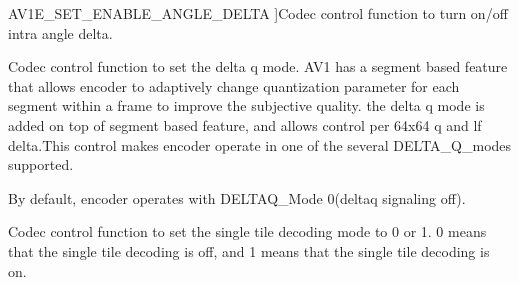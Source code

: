 \begin{Desc}
\begin{description}
{A\+V1\+E\+\_\+\+S\+E\+T\+\_\+\+E\+N\+A\+B\+L\+E\+\_\+\+A\+N\+G\+L\+E\+\_\+\+D\+E\+L\+TA\hypertarget{group__aom__encoder_ggae78dde67a6d78f332e9bdba0dde42db5a3155057080db493c868eb2d42d435b61}{}\label{group__aom__encoder_ggae78dde67a6d78f332e9bdba0dde42db5a3155057080db493c868eb2d42d435b61}
}]Codec control function to turn on/off intra angle delta. \item[{\em 
A\+V1\+E\+\_\+\+S\+E\+T\+\_\+\+D\+E\+L\+T\+A\+Q\+\_\+\+M\+O\+DE\hypertarget{group__aom__encoder_ggae78dde67a6d78f332e9bdba0dde42db5ad26eda6211bf3d5fe4f5999ec52b264b}{}\label{group__aom__encoder_ggae78dde67a6d78f332e9bdba0dde42db5ad26eda6211bf3d5fe4f5999ec52b264b}
}]Codec control function to set the delta q mode. A\+V1 has a segment based feature that allows encoder to adaptively change quantization parameter for each segment within a frame to improve the subjective quality. the delta q mode is added on top of segment based feature, and allows control per 64x64 q and lf delta.\+This control makes encoder operate in one of the several D\+E\+L\+T\+A\+\_\+\+Q\+\_\+modes supported.

By default, encoder operates with D\+E\+L\+T\+A\+Q\+\_\+\+Mode 0(deltaq signaling off). \item[{\em 
A\+V1\+E\+\_\+\+S\+E\+T\+\_\+\+S\+I\+N\+G\+L\+E\+\_\+\+T\+I\+L\+E\+\_\+\+D\+E\+C\+O\+D\+I\+NG\hypertarget{group__aom__encoder_ggae78dde67a6d78f332e9bdba0dde42db5af341538631ffe2ac2b562c8b5336a10a}{}\label{group__aom__encoder_ggae78dde67a6d78f332e9bdba0dde42db5af341538631ffe2ac2b562c8b5336a10a}
}]Codec control function to set the single tile decoding mode to 0 or 1. 0 means that the single tile decoding is off, and 1 means that the single tile decoding is on.


\end{description}
\end{Desc}
